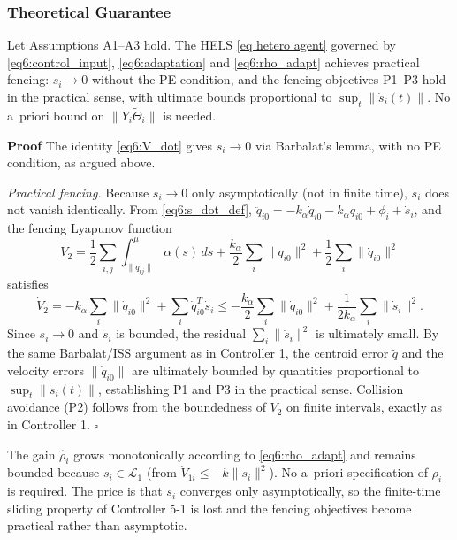 \subsubsection{Theoretical Guarantee}

\begin{theorem}
	Let Assumptions A1--A3 hold. The HELS \eqref{eq hetero agent} governed by
	\eqref{eq6:control_input}, \eqref{eq6:adaptation} and \eqref{eq6:rho_adapt}
	achieves practical fencing: $s_i \to 0$ without the PE condition, and the fencing
	objectives P1--P3 hold in the practical sense, with ultimate bounds proportional to
	$\sup_t\|\dot{s}_i(t)\|$. No a~priori bound on $\|Y_i\tilde{\Theta}_i\|$ is needed.
\end{theorem}

\noindent\textbf{Proof}
The identity \eqref{eq6:V_dot} gives $s_i \to 0$ via Barbalat's lemma, with no PE
condition, as argued above.

\noindent\textit{Practical fencing.}
Because $s_i \to 0$ only asymptotically (not in finite time), $\dot{s}_i$ does not vanish
identically. From \eqref{eq6:s_dot_def},
$\ddot{q}_{i0} = -k_\alpha\dot{q}_{i0} - k_\alpha q_{i0} + \phi_i + \dot{s}_i$, and the
fencing Lyapunov function
\begin{equation*}
	V_2 = \frac12\sum_{i,j}\int_{\|q_{ij}\|}^{\mu}\alpha(s)\,ds
		+ \frac{k_\alpha}{2}\sum_i\|q_{i0}\|^2
		+ \frac12\sum_i\|\dot{q}_{i0}\|^2
\end{equation*}
satisfies
\begin{equation*}
	\dot{V}_2 = -k_\alpha\sum_i\|\dot{q}_{i0}\|^2 + \sum_i\dot{q}_{i0}^T\dot{s}_i
	\le -\frac{k_\alpha}{2}\sum_i\|\dot{q}_{i0}\|^2
		+ \frac{1}{2k_\alpha}\sum_i\|\dot{s}_i\|^2.
\end{equation*}
Since $s_i \to 0$ and $\dot{s}_i$ is bounded, the residual $\sum_i\|\dot{s}_i\|^2$ is
ultimately small. By the same Barbalat/ISS argument as in Controller 1, the centroid
error $\tilde{q}$ and the velocity errors $\|\dot{q}_{i0}\|$ are ultimately bounded by
quantities proportional to $\sup_t\|\dot{s}_i(t)\|$, establishing P1 and P3 in the
practical sense. Collision avoidance (P2) follows from the boundedness of $V_2$ on finite
intervals, exactly as in Controller 1.
\hfill$\square$

\begin{remark}
	The gain $\hat{\rho}_i$ grows monotonically according to \eqref{eq6:rho_adapt} and
	remains bounded because $s_i \in \mathcal{L}_1$ (from $\dot{V}_{1i} \le -k\|s_i\|^2$).
	No a~priori specification of $\rho_i$ is required. The price is that $s_i$ converges
	only asymptotically, so the finite-time sliding property of Controller 5-1 is lost
	and the fencing objectives become practical rather than asymptotic.
\end{remark}